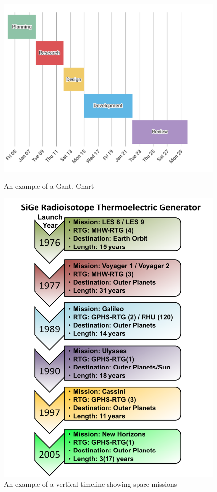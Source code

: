 \documentclass{report}
\begin{document}
\begin{figure}[h]
    \centering
    \begin{minipage}{0.5\textwidth}
        \centering
        \includegraphics[width=1.2\textwidth]{gantt}
        \caption{An example of a Gantt Chart}
    \end{minipage}\hfill
    \begin{minipage}{0.45\textwidth}
        \centering
        \includegraphics[width=1.1\textwidth]{nasa}
        \caption{An example of a vertical timeline showing space missions}
    \end{minipage}
\end{figure}
\end{document}
